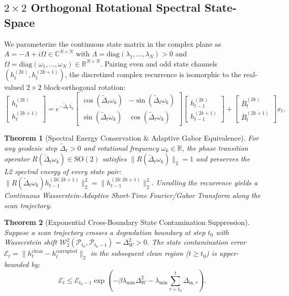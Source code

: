 \documentclass[10pt,journal,compsoc]{IEEEtran}
\newtheorem{theorem}{Theorem}
\begin{document}
\subsection{$2 \times 2$ Orthogonal Rotational Spectral State-Space}
We parameterize the continuous state matrix in the complex plane as $A = -\Lambda + i\Omega \in \mathbb{C}^{N \times N}$ with $\Lambda = \mathrm{diag}(\lambda_1, \dots, \lambda_N) > 0$ and $\Omega = \mathrm{diag}(\omega_1, \dots, \omega_N) \in \mathbb{R}^{N \times N}$. Pairing even and odd state channels $(h_t^{(2k)}, h_t^{(2k+1)})$, the discretized complex recurrence is isomorphic to the real-valued $2 \times 2$ block-orthogonal rotation:
\begin{equation}
\begin{bmatrix} h_t^{(2k)} \\ h_t^{(2k+1)} \end{bmatrix} = e^{-\tilde{\Delta}_t \lambda_k} \begin{bmatrix} \cos(\tilde{\Delta}_t \omega_k) & -\sin(\tilde{\Delta}_t \omega_k) \\ \sin(\tilde{\Delta}_t \omega_k) & \cos(\tilde{\Delta}_t \omega_k) \end{bmatrix} \begin{bmatrix} h_{t-1}^{(2k)} \\ h_{t-1}^{(2k+1)} \end{bmatrix} + \begin{bmatrix} \overline{B}_t^{(2k)} \\ \overline{B}_t^{(2k+1)} \end{bmatrix} x_t.
\end{equation}

\begin{theorem}[Spectral Energy Conservation \& Adaptive Gabor Equivalence]
For any geodesic step $\tilde{\Delta}_t > 0$ and rotational frequency $\omega_k \in \mathbb{R}$, the phase transition operator $R(\tilde{\Delta}_t \omega_k) \in \mathrm{SO}(2)$ satisfies $\|R(\tilde{\Delta}_t \omega_k)\|_2 = 1$ and preserves the L2 spectral energy of every state pair: $\|R(\tilde{\Delta}_t \omega_k) h_{t-1}^{(2k:2k+1)}\|_2^2 = \|h_{t-1}^{(2k:2k+1)}\|_2^2$. Unrolling the recurrence yields a Continuous Wasserstein-Adaptive Short-Time Fourier/Gabor Transform along the scan trajectory.
\end{theorem}

\begin{theorem}[Exponential Cross-Boundary State Contamination Suppression]
Suppose a scan trajectory crosses a degradation boundary at step $t_0$ with Wasserstein shift $\mathcal{W}_2^2(\mathcal{P}_{t_0}, \mathcal{P}_{t_0-1}) = \Delta_W^2 > 0$. The state contamination error $\mathcal{E}_t = \|h_t^{\mathrm{clean}} - h_t^{\mathrm{corrupted}}\|_2$ in the subsequent clean region ($t \ge t_0$) is upper-bounded by:
\begin{equation}
    \mathcal{E}_t \le \mathcal{E}_{t_0-1} \exp\left(-\beta \lambda_{\min} \Delta_W^2 - \lambda_{\min} \sum_{\tau=t_0}^{t} \Delta_{\mathrm{in}, \tau}\right).
\end{equation}
\end{theorem}
\end{document}
